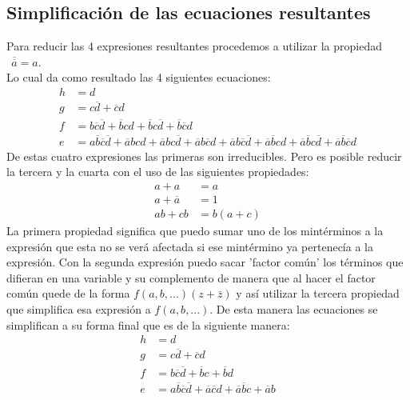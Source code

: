 \subsection{Simplificación de las ecuaciones resultantes}
Para reducir las 4 expresiones resultantes procedemos a utilizar la propiedad $~~\overline{\overline{a}}=a$.\\
Lo cual da como resultado las 4 siguientes ecuaciones:
\begin{align*}
	h & = d                                                                                                                                                                                                                                                        \\
	g & = c\overline{d}+\overline{c}d                                                                                                                                                                                                                              \\
	f & = b\overline{c}\overline{d}+\overline{b}cd+\overline{b}c\overline{d}+\overline{b}\overline{c}d                                                                                                                                                             \\
	e & = a\overline{b}\overline{c}\overline{d}+\overline{a}bcd+\overline{a}bc\overline{d}+\overline{a}b\overline{c}d+\overline{a}b\overline{c}\overline{d}+\overline{a}\overline{b}cd+\overline{a}\overline{b}c\overline{d}+\overline{a}\overline{b}\overline{c}d 
\end{align*}
De estas cuatro expresiones las primeras son irreducibles. Pero es posible reducir la tercera y la cuarta con el uso de las siguientes propiedades:
\begin{align*}
	a+a            & = a      \\
	a+\overline{a} & = 1      \\
	ab+cb          & = b(a+c) 
\end{align*} 
La primera propiedad significa que puedo sumar uno de los mintérminos a la expresión que esta no se verá afectada si ese mintérmino ya pertenecía a la expresión. Con la segunda expresión puedo sacar 'factor común' los términos que difieran en una variable y su complemento de manera que al hacer el factor común quede de la forma $f(a,b,...)(z+\overline{z})$ y así utilizar la tercera propiedad que simplifica esa expresión a $f(a,b,...)$. De esta manera las ecuaciones se simplifican a su forma final que es de la siguiente manera:
\begin{align*}
	h & = d                                                                                                       \\
	g & = c\overline{d}+\overline{c}d                                                                             \\
	f & = b\overline{c}\overline{d}+\overline{b}c+\overline{b}d                                                   \\
	e & = a\overline{b}\overline{c}\overline{d}+\overline{a}\overline{c}d+\overline{a}\overline{b}c+\overline{a}b 
\end{align*}


